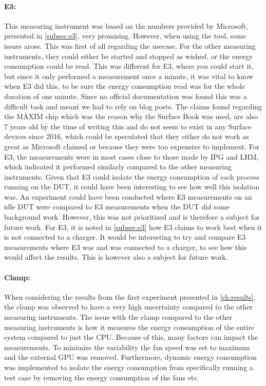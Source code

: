 \paragraph*{E3:} This measuring instrument was based on the numbers provided by Microsoft, presented in \cref{subsec:e3}, very promising. However, when using the tool, some issues arose. This was first of all regarding the usecase. For the other measuring instruments, they could either be started and stopped as wished, or the energy consumption could be read. This was different for E3, where you could start it, but since it only performed a measurement once a minute, it was vital to know when E3 did this, to be sure the energy consumption read was for the whole duration of one minute. Since no official documentation was found this was a difficult task and meant we had to rely on blog posts. The claims found regarding the MAXIM chip which was the reason why the Surface Book was used, are also 7 years old by the time of writing this and do not seem to exist in any Surface devices since 2016, which could be speculated that they either do not work as great as Microsoft claimed or because they were too expensive to implement. For E3, the measurements were in most cases close to those made by IPG and LHM, which indicated it performed similarly compared to the other measuring instruments. Given that E3 could isolate the energy consumption of each process running on the DUT, it could have been interesting to see how well this isolation was. An experiment could have been conducted where E3 measurements on an idle DUT were compared to E3 measurements when the DUT did some background work. However, this was not prioritized and is therefore a subject for future work. For E3, it is noted in \cref{subsec:e3} how E3 claims to work best when it is not connected to a charger. It would be interesting to try and compare E3 measurements where E3 was and was connected to a charger, to see how this would affect the results. This is however also a subject for future work.


\paragraph*{Clamp:} When considering the results from the first experiment presented in \cref{ch:results}, the clamp was observed to have a very high uncertainty compared to the other measuring instruments. The issue with the clamp compared to the other measuring instruments is how it measures the energy consumption of the entire system compared to just the CPU. Because of this, many factors can impact the measurements. To minimize the variability the fan speed was set to maximum and the external GPU was removed. Furthermore, dynamic energy consumption was implemented to isolate the energy consumption from specifically running a test case by removing the energy consumption of the fans etc.


